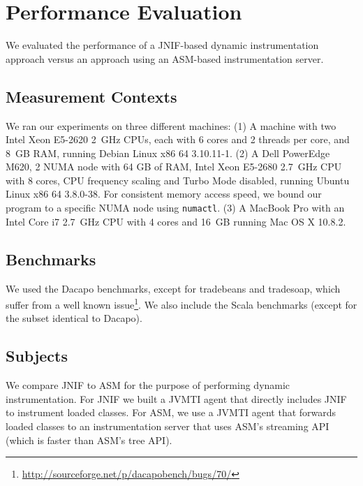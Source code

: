 \section{Performance Evaluation}
\label{sec:jnif-evaluation}

We evaluated the performance of a JNIF-based dynamic instrumentation approach 
versus an approach using an ASM-based instrumentation server.

\subsection*{Measurement Contexts}

We ran our experiments on three different machines:
(1) A machine with two Intel Xeon E5-2620 2~GHz CPUs, 
each with 6 cores and 2 threads per core, 
and 8~GB RAM,
running Debian Linux x86 64 3.10.11-1.
(2) A Dell PowerEdge M620, 2 NUMA node with 64 GB of RAM, 
Intel Xeon E5-2680 2.7~GHz CPU
with 8 cores, 
CPU frequency scaling and Turbo Mode disabled,
running Ubuntu Linux x86 64 3.8.0-38.
For consistent memory access speed, 
we bound our program to a specific NUMA node using \texttt{numactl}.
(3) A MacBook Pro with an Intel Core i7 2.7~GHz CPU 
with 4 cores and 16~GB
running Mac OS X 10.8.2.

%




\subsection*{Benchmarks}

We used the Dacapo benchmarks, 
except for tradebeans and tradesoap,
which suffer from a well known issue\footnote{\url{http://sourceforge.net/p/dacapobench/bugs/70/}}.
We also include the Scala benchmarks (except for the subset identical to Dacapo).





\subsection*{Subjects}
We compare JNIF to ASM for the purpose of performing dynamic instrumentation.
For JNIF we built a JVMTI agent that directly includes JNIF to instrument loaded classes.
For ASM, we use a JVMTI agent that forwards loaded classes to an instrumentation server
that uses ASM's streaming API (which is faster than ASM's tree API).


